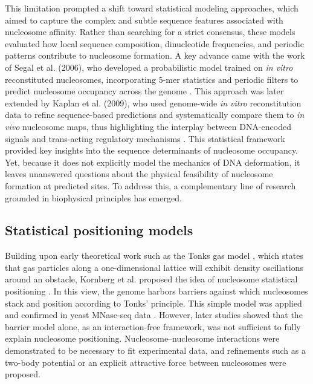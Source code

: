 \documentclass[11pt]{book}
\begin{document}
This limitation prompted a shift toward statistical modeling approaches, which aimed to capture the complex and subtle sequence features associated with nucleosome affinity. Rather than searching for a strict consensus, these models evaluated how local sequence composition, dinucleotide frequencies, and periodic patterns contribute to nucleosome formation. A key advance came with the work of Segal et al. (2006), who developed a probabilistic model trained on \textit{in vitro} reconstituted nucleosomes, incorporating 5-mer statistics and periodic filters to predict nucleosome occupancy across the genome \cite{segal_genomic_2006}. This approach was later extended by Kaplan et al. (2009), who used genome-wide \textit{in vitro} reconstitution data to refine sequence-based predictions and systematically compare them to \textit{in vivo} nucleosome maps, thus highlighting the interplay between DNA-encoded signals and trans-acting regulatory mechanisms \cite{kaplanDNAencodedNucleosomeOrganization2009}. This statistical framework provided key insights into the sequence determinants of nucleosome occupancy. Yet, because it does not explicitly model the mechanics of DNA deformation, it leaves unanswered questions about the physical feasibility of nucleosome formation at predicted sites. To address this, a complementary line of research grounded in biophysical principles has emerged.

\subsection{Statistical positioning models}
Building upon early theoretical work such as the Tonks gas model \cite{tonks_complete_1936}, which states that gas particles along a one-dimensional lattice will exhibit density oscillations around an obstacle, Kornberg et al. proposed the idea of nucleosome statistical positioning \cite{kornberg_statistical_1988}. In this view, the genome harbors barriers against which nucleosomes stack and position according to Tonks’ principle. This simple model was applied and confirmed in yeast MNase-seq data \cite{mavrich_barrier_2008, mobius_quantitative_2010}. However, later studies showed that the barrier model alone, as an interaction-free framework, was not sufficient to fully explain nucleosome positioning. Nucleosome–nucleosome interactions were demonstrated to be necessary to fit experimental data, and refinements such as a two-body potential \cite{chereji_statistical_2011} or an explicit attractive force between nucleosomes \cite{riposo_nucleosome_2012} were proposed.
\end{document}
